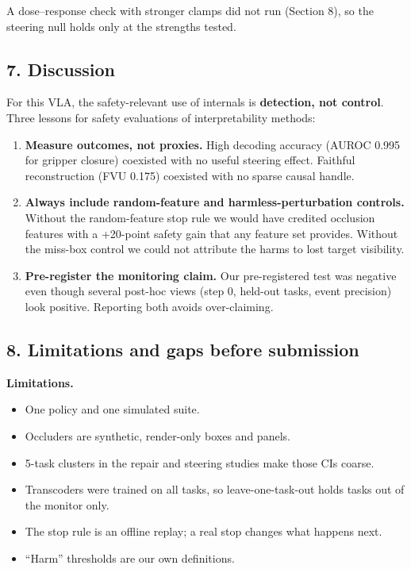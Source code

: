 \documentclass[
  10pt,
]{article}
\providecommand{\tightlist}{%
  \setlength{\itemsep}{0pt}\setlength{\parskip}{0pt}}
\begin{document}
A dose--response check with stronger clamps did not run (Section 8), so
the steering null holds only at the strengths tested.

\hypertarget{discussion}{%
\subsection{7. Discussion}\label{discussion}}

For this VLA, the safety-relevant use of internals is \textbf{detection,
not control}. Three lessons for safety evaluations of interpretability
methods:

\begin{enumerate}
\def\labelenumi{\arabic{enumi}.}
\tightlist
\item
  \textbf{Measure outcomes, not proxies.} High decoding accuracy (AUROC
  0.995 for gripper closure) coexisted with no useful steering effect.
  Faithful reconstruction (FVU 0.175) coexisted with no sparse causal
  handle.
\item
  \textbf{Always include random-feature and harmless-perturbation
  controls.} Without the random-feature stop rule we would have credited
  occlusion features with a +20-point safety gain that any feature set
  provides. Without the miss-box control we could not attribute the
  harms to lost target visibility.
\item
  \textbf{Pre-register the monitoring claim.} Our pre-registered test
  was negative even though several post-hoc views (step 0, held-out
  tasks, event precision) look positive. Reporting both avoids
  over-claiming.
\end{enumerate}

\hypertarget{limitations-and-gaps-before-submission}{%
\subsection{8. Limitations and gaps before
submission}\label{limitations-and-gaps-before-submission}}

\textbf{Limitations.}

\begin{itemize}
\tightlist
\item
  One policy and one simulated suite.
\item
  Occluders are synthetic, render-only boxes and panels.
\item
  5-task clusters in the repair and steering studies make those CIs
  coarse.
\item
  Transcoders were trained on all tasks, so leave-one-task-out holds
  tasks out of the monitor only.
\item
  The stop rule is an offline replay; a real stop changes what happens
  next.
\item
  ``Harm'' thresholds are our own definitions.
\end{itemize}
\end{document}
